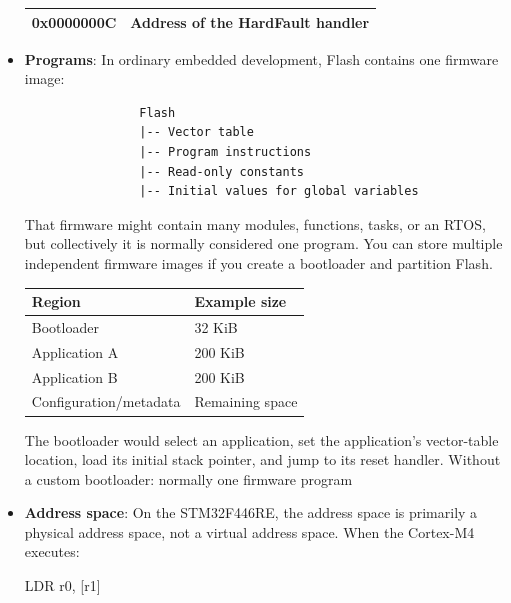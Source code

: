 \documentclass{report}
\begin{document}
\begin{itemize}
\begin{center}
\begin{tabularx}{\textwidth}{@{}XX@{}}
                    0x0000000C	&Address of the HardFault handler \\
                    \bottomrule
                \end{tabularx}
            \end{center}
        \item \textbf{Programs}: In ordinary embedded development, Flash contains one firmware image:
            \begin{verbatim}
                Flash
                |-- Vector table
                |-- Program instructions
                |-- Read-only constants
                |-- Initial values for global variables
            \end{verbatim}
            \bigbreak \noindent 
            That firmware might contain many modules, functions, tasks, or an RTOS, but collectively it is normally considered one program.
            \bigbreak \noindent 
            You can store multiple independent firmware images if you create a bootloader and partition Flash.
            \begin{center}
                \begin{tabularx}{\textwidth}{@{}XX@{}}
                    \toprule
                    \textbf{Region}&	\textbf{Example size} \\
                    \midrule
                    Bootloader	&32 KiB\\[2ex]
                    Application A	&200 KiB\\[2ex]
                    Application B	&200 KiB\\[2ex]
                    Configuration/metadata	&Remaining space \\
                    \bottomrule
                \end{tabularx}
            \end{center}
            The bootloader would select an application, set the application’s vector-table location, load its initial stack pointer, and jump to its reset handler.
            \bigbreak \noindent 
            Without a custom bootloader: normally one firmware program
        \item \textbf{Address space}: On the STM32F446RE, the address space is primarily a physical address space, not a virtual address space.
            \bigbreak \noindent 
            When the Cortex-M4 executes:
            \bigbreak \noindent 
            \begin{nasmcode}
                LDR r0, [r1]
            \end{nasmcode}

\end{itemize}
\end{document}
